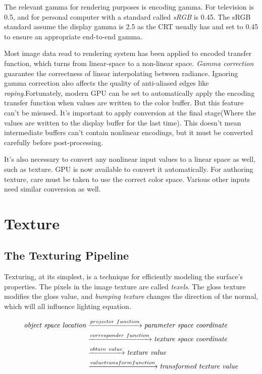 \documentclass[10pt, a4paper]{article}
\begin{document}
            The relevant gamma for rendering purposes is encoding gamma. For television is 0.5, and for personal computer with a standard called \emph{sRGB} is 0.45. The sRGB standard assume the display gamma is 2.5 as the CRT usually has and set to 0.45 to ensure an appropriate end-to-end gamma.
            
            Most image data read to rendering system has been applied to encoded transfer function, which turns from linear-space to a non-linear space. \emph{Gamma correction} guarantee the correctness of linear interpolating between radiance. Ignoring gamma correction also affects the quality of anti-aliased edges like \emph{roping}.Fortunately, modern GPU can be set to automatically apply the encoding transfer function when values are written to the color buffer. But this feature can't be misused. It's important to apply conversion at the final stage(Where the values are written to the display buffer for the last time). This doesn't mean intermediate buffers can't contain nonlinear encodings, but it must be converted carefully before post-processing. 
            
            It's also necessary to convert any nonlinear input values to a linear space as well, such as texture. GPU is now available to convert it automatically. For authoring texture, care must be taken to use the correct color space. Various other inputs need similar conversion as well.
            \newpage

\section{Texture}
\subsection{The Texturing Pipeline}
    Texturing, at its simplest, is a technique for efficiently modeling the surface's properties. The pixels in the image texture are called \emph{texels}. The gloss texture modifies the gloss value, and \emph{bumping texture} changes the direction of the normal, which will all influence lighting equation.
    
    \begin{align*}
        \text{\emph{{object space location}}} 
        &\xrightarrow{projector\ function} \emph{parameter space coordinate}\\
        &\xrightarrow{corresponder\ function} \emph{texture space coordinate} \\
        &\xrightarrow{obtain\ value} \emph{texture value}\\
        &\xrightarrow{value transform function} \emph{transformed  texture value}
    \end{align*}
\end{document}

